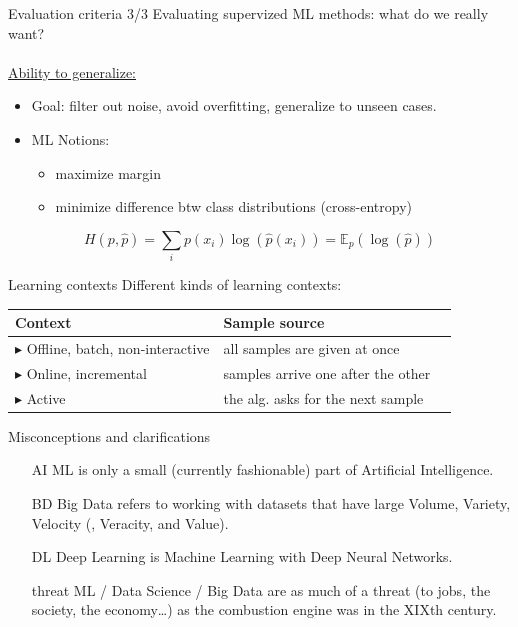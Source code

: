 \documentclass{beamer}
\begin{document}
\begin{frame}{Evaluation criteria 3/3}
Evaluating supervized ML methods: what do we really want?\\
~\\
\underline{Ability to generalize:}
\begin{itemize}
\item Goal: filter out noise, avoid overfitting, generalize to unseen cases.
\item ML Notions:
\begin{itemize}
\item maximize margin
\item minimize difference btw class distributions (cross-entropy)
\end{itemize}
\end{itemize}
$$H(p,\hat{p}) = \sum_i p(x_i) \log (\hat{p}(x_i)) = \mathbb{E}_p \left(\log(\hat{p})\right)$$
\end{frame}

\begin{frame}{Learning contexts}
Different kinds of learning contexts:\\
\hspace{0.1cm}
\begin{tabular}{lll}
Context & Sample source \\
\hline
{\scriptsize $\blacktriangleright$} Offline, batch, non-interactive & all samples are given at once\\
{\scriptsize $\blacktriangleright$} Online, incremental & samples arrive one after the other\\
{\scriptsize $\blacktriangleright$} Active & the alg. asks for the next sample
\end{tabular}
\end{frame}

\begin{frame}{Misconceptions and clarifications}
\begin{itemize}
\item[AI] ML is only a small (currently fashionable) part of Artificial Intelligence.
\item[BD] Big Data refers to working with datasets that have large Volume, Variety, Velocity (, Veracity, and Value).
\item[DL] Deep Learning is Machine Learning with Deep Neural Networks.
\item[threat] ML / Data Science / Big Data are as much of a threat (to jobs, the society, the economy\ldots) as the combustion engine was in the XIXth century.
\end{itemize}
\end{frame}
\end{document}
